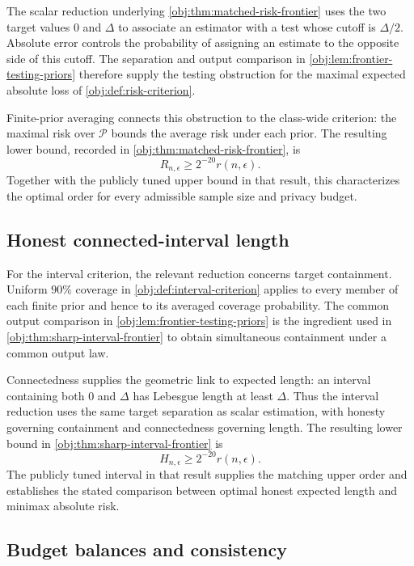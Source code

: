 \documentclass[11pt]{article}
\begin{document}
The scalar reduction underlying \cref{obj:thm:matched-risk-frontier} uses the two target values \(0\) and \(\Delta\) to associate an estimator with a test whose cutoff is \(\Delta/2\). Absolute error controls the probability of assigning an estimate to the opposite side of this cutoff. The separation and output comparison in \cref{obj:lem:frontier-testing-priors} therefore supply the testing obstruction for the maximal expected absolute loss of \cref{obj:def:risk-criterion}.

Finite-prior averaging connects this obstruction to the class-wide criterion: the maximal risk over \(\mathcal P\) bounds the average risk under each prior. The resulting lower bound, recorded in \cref{obj:thm:matched-risk-frontier}, is
\[
R_{n,\epsilon}\ge2^{-20}r(n,\epsilon).
\]
Together with the publicly tuned upper bound in that result, this characterizes the optimal order for every admissible sample size and privacy budget.

\subsection{Honest connected-interval length}

For the interval criterion, the relevant reduction concerns target containment. Uniform \(90\%\) coverage in \cref{obj:def:interval-criterion} applies to every member of each finite prior and hence to its averaged coverage probability. The common output comparison in \cref{obj:lem:frontier-testing-priors} is the ingredient used in \cref{obj:thm:sharp-interval-frontier} to obtain simultaneous containment under a common output law.

Connectedness supplies the geometric link to expected length: an interval containing both \(0\) and \(\Delta\) has Lebesgue length at least \(\Delta\). Thus the interval reduction uses the same target separation as scalar estimation, with honesty governing containment and connectedness governing length. The resulting lower bound in \cref{obj:thm:sharp-interval-frontier} is
\[
H_{n,\epsilon}\ge2^{-20}r(n,\epsilon).
\]
The publicly tuned interval in that result supplies the matching upper order and establishes the stated comparison between optimal honest expected length and minimax absolute risk.

\subsection{Budget balances and consistency}
\end{document}
